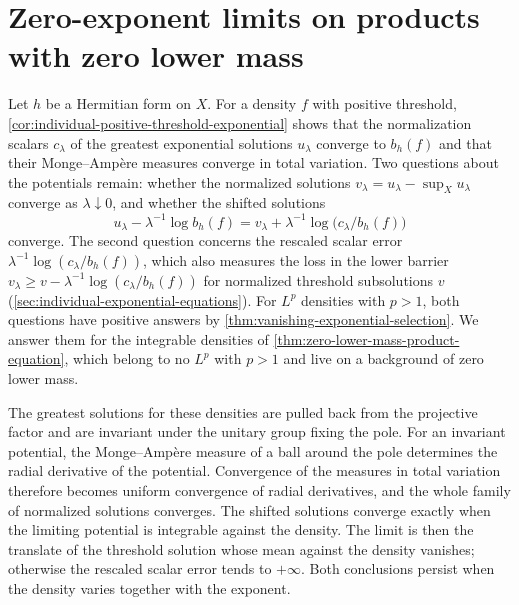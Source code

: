 \section{Zero-exponent limits on products with zero lower mass}
\label{sec:nonlp-selection}

Let $h$ be a Hermitian form on $X$. For a density $f$ with positive threshold, \cref{cor:individual-positive-threshold-exponential} shows that the normalization scalars $c_\lambda$ of the greatest exponential solutions $u_\lambda$ converge to $b_h(f)$ and that their Monge--Amp\`ere measures converge in total variation. Two questions about the potentials remain: whether the normalized solutions $v_\lambda=u_\lambda-\sup_Xu_\lambda$ converge as $\lambda\downarrow0$, and whether the shifted solutions
\[
 u_\lambda-\lambda^{-1}\log b_h(f)=v_\lambda+\lambda^{-1}\log\bigl(c_\lambda/b_h(f)\bigr)
\]
converge. The second question concerns the rescaled scalar error $\lambda^{-1}\log(c_\lambda/b_h(f))$, which also measures the loss in the lower barrier $v_\lambda\geq v-\lambda^{-1}\log(c_\lambda/b_h(f))$ for normalized threshold subsolutions $v$ (\cref{sec:individual-exponential-equations}). For $L^p$ densities with $p>1$, both questions have positive answers by \cref{thm:vanishing-exponential-selection}. We answer them for the integrable densities of \cref{thm:zero-lower-mass-product-equation}, which belong to no $L^p$ with $p>1$ and live on a background of zero lower mass.

The greatest solutions for these densities are pulled back from the projective factor and are invariant under the unitary group fixing the pole. For an invariant potential, the Monge--Amp\`ere measure of a ball around the pole determines the radial derivative of the potential. Convergence of the measures in total variation therefore becomes uniform convergence of radial derivatives, and the whole family of normalized solutions converges. The shifted solutions converge exactly when the limiting potential is integrable against the density. The limit is then the translate of the threshold solution whose mean against the density vanishes; otherwise the rescaled scalar error tends to $+\infty$. Both conclusions persist when the density varies together with the exponent.

